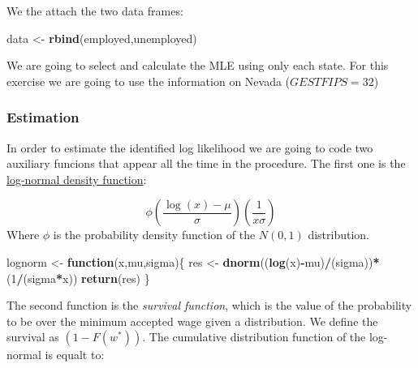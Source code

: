 \documentclass[]{book}
\newenvironment{Shaded}{\begin{snugshade}}{\end{snugshade}}
\newcommand{\KeywordTok}[1]{\textcolor[rgb]{0.13,0.29,0.53}{\textbf{#1}}}
\newcommand{\DecValTok}[1]{\textcolor[rgb]{0.00,0.00,0.81}{#1}}
\newcommand{\StringTok}[1]{\textcolor[rgb]{0.31,0.60,0.02}{#1}}
\newcommand{\ControlFlowTok}[1]{\textcolor[rgb]{0.13,0.29,0.53}{\textbf{#1}}}
\newcommand{\OperatorTok}[1]{\textcolor[rgb]{0.81,0.36,0.00}{\textbf{#1}}}
\newcommand{\NormalTok}[1]{#1}
\begin{document}
We the attach the two data frames:

\begin{Shaded}
\begin{Highlighting}[]
\NormalTok{data <-}\StringTok{ }\KeywordTok{rbind}\NormalTok{(employed,unemployed)}
\end{Highlighting}
\end{Shaded}

We are going to select and calculate the MLE using only each state. For
this exercise we are going to use the information on Nevada
(\(GESTFIPS = 32\))

\begin{Shaded}
\end{Shaded}

\subsubsection{Estimation}\label{estimation-1}

In order to estimate the identified log likelihood we are going to code
two auxiliary funcions that appear all the time in the procedure. The
first one is the
\href{https://en.wikipedia.org/wiki/Log-normal_distribution}{log-normal
density function}:

\[\phi \left( \frac{\log(x) - \mu}{\sigma} \right)(\frac{1}{x \sigma})\]
Where \(\phi\) is the probability density function of the \(N(0,1)\)
distribution.

\begin{Shaded}
\begin{Highlighting}[]
\NormalTok{lognorm <-}\StringTok{ }\ControlFlowTok{function}\NormalTok{(x,mu,sigma)\{}
\NormalTok{        res <-}\StringTok{ }\KeywordTok{dnorm}\NormalTok{((}\KeywordTok{log}\NormalTok{(x)}\OperatorTok{-}\NormalTok{mu)}\OperatorTok{/}\NormalTok{(sigma))}\OperatorTok{*}\NormalTok{(}\DecValTok{1}\OperatorTok{/}\NormalTok{(sigma}\OperatorTok{*}\NormalTok{x))}
        \KeywordTok{return}\NormalTok{(res)}
\NormalTok{\}}
\end{Highlighting}
\end{Shaded}

The second function is the \emph{survival function}, which is the value
of the probability to be over the minimum accepted wage given a
distribution. We define the survival as \((1- F(w^*))\). The cumulative
distribution function of the log-normal is equalt to:
\end{document}
